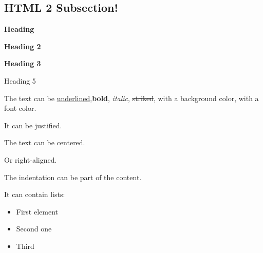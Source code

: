 \documentclass[letter,titlepage,oneside,11pt]{report}%
\begin{document}
\subsection{HTML 2 Subsection!}%
\par%
\par%
\begin{FlushLeft}%
{\huge \textbf{Heading}}%
\end{FlushLeft}%
\par%
\begin{FlushLeft}%
{\LARGE \textbf{Heading 2}}%
\end{FlushLeft}%
\par%
\begin{FlushLeft}%
{\Large \textbf{Heading 3}}%
\end{FlushLeft}%
\par%
\begin{FlushLeft}%
{\large Heading 5}%
\end{FlushLeft}%
\par%
\begin{FlushLeft}%
The text can be \underline{underlined,}\textbf{bold}, \textit{italic}, \sout{striked}, with a \colorbox[rgb]{0.8,0.8,0.0}{background color}, with a {\color[rgb]{0.5568627450980392,0.26666666666666666,0.6784313725490196}font color.}%
\end{FlushLeft}%
\par%
\begin{justify}%
It can be justified.%
\end{justify}%
\par%
\begin{Center}%
The text can be centered.%
\end{Center}%
\par%
\begin{FlushRight}%
Or right-aligned.%
\end{FlushRight}%
\par%
\begin{FlushLeft}%
\begin{adjustwidth}{40pt}{}%
The indentation can be part of the content.%
\end{adjustwidth}%
\end{FlushLeft}%
\par%
\begin{FlushLeft}%
It can contain lists:%
\end{FlushLeft}%
\begin{itemize}%
\item First element%
\item Second one%
\item Third%
\end{itemize}%
\end{document}
